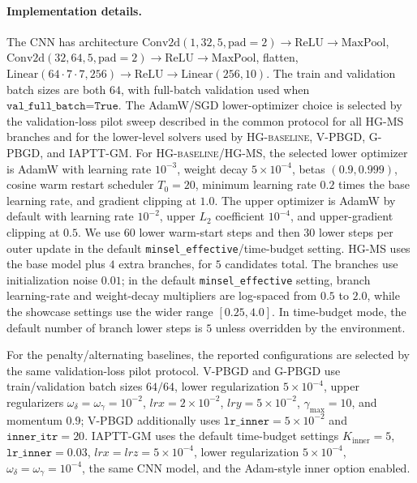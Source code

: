 \documentclass{article}
\theoremstyle{normaltheorem}
\begin{document}
\paragraph{Implementation details.}
The CNN has architecture
\(\mathrm{Conv2d}(1,32,5,\mathrm{pad}=2)\to\mathrm{ReLU}\to\mathrm{MaxPool}\),
\(\mathrm{Conv2d}(32,64,5,\mathrm{pad}=2)\to\mathrm{ReLU}\to\mathrm{MaxPool}\), flatten,
\(\mathrm{Linear}(64\cdot7\cdot7,256)\to\mathrm{ReLU}\to\mathrm{Linear}(256,10)\).
The train and validation batch sizes are both \(64\), with full-batch validation used when
\(\texttt{val\_full\_batch=True}\).
The AdamW/SGD lower-optimizer choice is selected by the validation-loss pilot sweep described in the common protocol for
all \textsc{HG-MS} branches and for the lower-level solvers used by \textsc{HG-baseline}, V-PBGD, G-PBGD, and IAPTT-GM.
For \textsc{HG-baseline}/\textsc{HG-MS}, the selected lower optimizer is AdamW with learning rate \(10^{-3}\), weight decay
\(5\times10^{-4}\), betas \((0.9,0.999)\), cosine warm restart scheduler \(T_0=20\), minimum learning rate
\(0.2\) times the base learning rate, and gradient clipping at \(1.0\). The upper optimizer is AdamW by default with
learning rate \(10^{-2}\), upper \(L_2\) coefficient \(10^{-4}\), and upper-gradient clipping at \(0.5\).
We use \(60\) lower warm-start steps and then \(30\) lower steps per outer update in the default
\texttt{minsel\_effective}/time-budget setting. \textsc{HG-MS} uses the base model plus \(4\) extra branches, for \(5\)
candidates total. The branches use initialization noise \(0.01\); in the default \texttt{minsel\_effective} setting,
branch learning-rate and weight-decay multipliers are log-spaced from \(0.5\) to \(2.0\), while the showcase settings use
the wider range \([0.25,4.0]\). In time-budget mode, the default number of branch lower steps is \(5\) unless overridden by the
environment.

For the penalty/alternating baselines, the reported configurations are selected by the same validation-loss pilot
protocol. V-PBGD and G-PBGD use train/validation batch sizes \(64/64\), lower regularization
\(5\times10^{-4}\), upper regularizers \(\omega_\delta=\omega_\gamma=10^{-2}\), \(lrx=2\times10^{-2}\),
\(lry=5\times10^{-2}\), \(\gamma_{\max}=10\), and momentum \(0.9\); V-PBGD additionally uses
\(\texttt{lr\_inner}=5\times10^{-2}\) and \(\texttt{inner\_itr}=20\). IAPTT-GM uses the default time-budget settings
\(K_{\mathrm{inner}}=5\), \(\texttt{lr\_inner}=0.03\), \(lrx=lrz=5\times10^{-4}\), lower regularization
\(5\times10^{-4}\), \(\omega_\delta=\omega_\gamma=10^{-4}\), the same CNN model, and the Adam-style inner option enabled.
\end{document}
